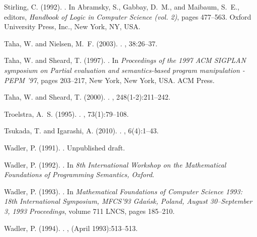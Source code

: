 \documentclass[a4paper]{amsart}
\begin{document}
\begin{thebibliography}{}
Stirling, C. (1992).
.
\newblock In Abramsky, S., Gabbay, D.~M., and Maibaum, S.~E., editors, {\em
  Handbook of Logic in Computer Science (vol. 2)}, pages 477--563. Oxford
  University Press, Inc., New York, NY, USA.

Taha, W. and Nielsen, M.~F. (2003).
.
, 38:26--37.

Taha, W. and Sheard, T. (1997).
.
\newblock In {\em Proceedings of the 1997 ACM SIGPLAN symposium on Partial
  evaluation and semantics-based program manipulation - PEPM '97}, pages
  203--217, New York, New York, USA. ACM Press.

Taha, W. and Sheard, T. (2000).
.
, 248(1-2):211--242.

Troelstra, A.~S. (1995).
.
, 73(1):79--108.

Tsukada, T. and Igarashi, A. (2010).
.
, 6(4):1--43.

Wadler, P. (1991).
.
\newblock Unpublished draft.

Wadler, P. (1992).
.
\newblock In {\em 8th International Workshop on the Mathematical Foundations of
  Programming Semantics, Oxford}.

Wadler, P. (1993).
.
\newblock In {\em Mathematical Foundations of Computer Science 1993: 18th
  International Symposium, MFCS'93 Gda{\'{n}}sk, Poland, August 30–September
  3, 1993 Proceedings}, volume 711 LNCS, pages 185--210.

Wadler, P. (1994).
.
, (April 1993):513--513.


\end{thebibliography}
\end{document}
